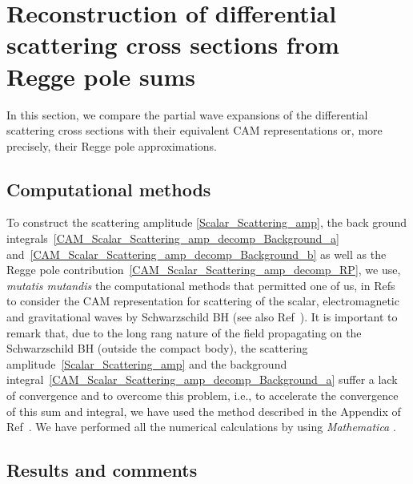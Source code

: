 \documentclass[aps,prd,longbibliography,reprint,twocolumn,amsmath,amssymb,amsfonts,showpacs,superscriptaddress]{revtex4-1}%
\begin{document}
\section{Reconstruction of differential scattering cross sections from Regge pole sums}
\label{SecIII}

In this section,  we compare the partial wave expansions of the differential scattering cross sections with their equivalent CAM representations or, more precisely, their Regge pole approximations.

\subsection{Computational methods}
\label{SecIIIa}

To construct the scattering amplitude \eqref{Scalar_Scattering_amp}, the back ground integrals~\eqref{CAM_Scalar_Scattering_amp_decomp_Background_a} and~\eqref{CAM_Scalar_Scattering_amp_decomp_Background_b} as well as the Regge pole contribution~\eqref{CAM_Scalar_Scattering_amp_decomp_RP}, we use, \textit{mutatis mutandis} the computational methods that permitted one of us, in Refs~\cite{Folacci:2019cmc,Folacci:2019vtt} to consider the CAM representation for scattering of the scalar, electromagnetic and gravitational waves by Schwarzschild BH (see also Ref~\cite{Dolan:2017rtj}). It is important to remark that, due to the long rang nature of the field propagating on the Schwarzschild BH (outside the compact body), the scattering amplitude~\eqref{Scalar_Scattering_amp} and the background integral~\eqref{CAM_Scalar_Scattering_amp_decomp_Background_a} suffer a lack of convergence and to overcome this problem, i.e., to accelerate the convergence of this sum and integral, we have used the method described in the Appendix of Ref~\cite{Folacci:2019cmc}. We have performed all the numerical calculations by using {\it Mathematica} \cite{Mathematica}.


\subsection{Results and comments}
\label{SecIIIb}
\end{document}
